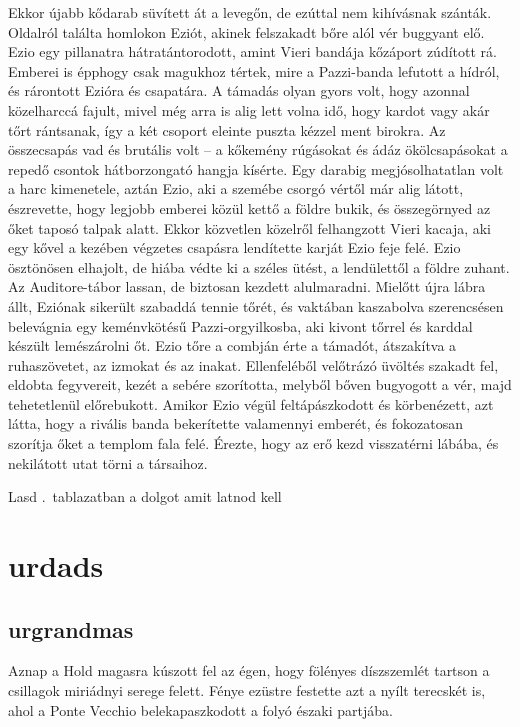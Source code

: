\documentclass[12pt,a4paper,twoside]{report}
\theoremstyle{definition}
\begin{document}
Ekkor  újabb  kődarab  süvített  át  a  levegőn,  de  ezúttal  nem 
kihívásnak  szánták.  Oldalról  találta  homlokon  Eziót,  akinek 
felszakadt  bőre  alól  vér  buggyant  elő.  Ezio  egy  pillanatra 
hátratántorodott, amint Vieri bandája kőzáport zúdított rá. Emberei is 
épphogy csak magukhoz tértek, mire a Pazzi-banda lefutott a hídról, 
és rárontott Ezióra és csapatára. A támadás olyan gyors volt, hogy 
azonnal közelharccá fajult, mivel még arra is alig lett volna idő, hogy 
kardot  vagy  akár  tőrt  rántsanak,  így  a  két  csoport  eleinte  puszta 
kézzel ment birokra. 
Az összecsapás vad és brutális volt – a kőkemény rúgásokat és 
ádáz ökölcsapásokat a repedő csontok hátborzongató hangja kísérte. 
Egy darabig megjósolhatatlan volt a harc kimenetele, aztán Ezio, aki 
a  szemébe  csorgó  vértől  már  alig  látott,  észrevette,  hogy  legjobb 
emberei közül kettő a földre bukik, és összegörnyed az őket taposó 
talpak alatt. Ekkor közvetlen közelről felhangzott Vieri kacaja, aki 
egy kővel a kezében végzetes csapásra lendítette karját Ezio feje felé. 
Ezio  ösztönösen  elhajolt,  de  hiába  védte  ki  a  széles  ütést,  a 
lendülettől  a  földre  zuhant.  Az  Auditore-tábor  lassan,  de  biztosan 
kezdett  alulmaradni.  Mielőtt  újra  lábra  állt,  Eziónak  sikerült 
szabaddá  tennie  tőrét,  és  vaktában  kaszabolva  szerencsésen 
belevágnia egy keménvkötésű Pazzi-orgyilkosba, aki kivont tőrrel és 
karddal készült lemészárolni őt. Ezio tőre a combján érte a támadót, 
átszakítva  a  ruhaszövetet,  az  izmokat  és  az  inakat.  Ellenfeléből 
velőtrázó  üvöltés  szakadt  fel,  eldobta  fegyvereit,  kezét  a  sebére 
szorította,  melyből  bőven  bugyogott  a  vér,  majd  tehetetlenül 
előrebukott. 
Amikor Ezio végül feltápászkodott és körbenézett, azt látta, hogy a 
rivális banda bekerítette valamennyi emberét, és fokozatosan szorítja 
őket a templom fala felé. Érezte, hogy az erő kezd visszatérni lábába, 
és  nekilátott  utat  törni  a  társaihoz.

Lasd \az{\ref{abra-raid}}.~tablazatban a dolgot amit latnod kell
\chapter{urdads}
\section{urgrandmas}
Aznap  a  Hold  magasra  kúszott  fel  az  égen,  hogy  fölényes 
díszszemlét tartson a csillagok miriádnyi serege felett. Fénye ezüstre 
festette  azt  a  nyílt  terecskét  is,  ahol  a  Ponte  Vecchio 
belekapaszkodott a folyó északi partjába. 
\end{document}
